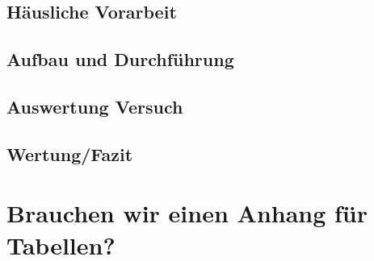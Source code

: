 \documentclass[a4paper]{scrartcl}
\numberwithin{equation}{subsection}
\begin{document}
\subsection{Häusliche Vorarbeit}

\newpage

\subsection{Aufbau und Durchführung}

\newpage

\subsection{Auswertung Versuch}

\newpage

\subsection{Wertung/Fazit}

\newpage

\section{Brauchen wir einen Anhang für Tabellen?}

\newpage






\label{LastPage}
\end{document}
